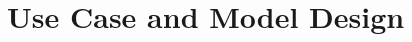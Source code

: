 \documentclass[conference]{../../setup/IEEEtran}
\begin{document}




% 

\section{Use Case and Model Design} \label{sec:Use Case and Model Design}
\end{document}
